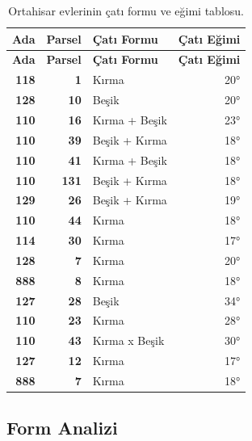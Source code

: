 \documentclass[12pt,turkish,a4paperpaper,]{report}
\begin{document}
\begin{longtable}[]{@{}rrlr@{}}
\caption{Ortahisar evlerinin çatı formu ve eğimi
tablosu.}\tabularnewline
\toprule
\textbf{Ada} & \textbf{Parsel} & \textbf{Çatı Formu} & \textbf{Çatı
Eğimi}\tabularnewline
\midrule
\endfirsthead
\toprule
\textbf{Ada} & \textbf{Parsel} & \textbf{Çatı Formu} & \textbf{Çatı
Eğimi}\tabularnewline
\midrule
\endhead
\textbf{118} & \textbf{1} & Kırma & 20°\tabularnewline
\textbf{128} & \textbf{10} & Beşik & 20°\tabularnewline
\textbf{110} & \textbf{16} & Kırma + Beşik & 23°\tabularnewline
\textbf{110} & \textbf{39} & Beşik + Kırma & 18°\tabularnewline
\textbf{110} & \textbf{41} & Kırma + Beşik & 18°\tabularnewline
\textbf{110} & \textbf{131} & Beşik + Kırma & 18°\tabularnewline
\textbf{129} & \textbf{26} & Beşik + Kırma & 19°\tabularnewline
\textbf{110} & \textbf{44} & Kırma & 18°\tabularnewline
\textbf{114} & \textbf{30} & Kırma & 17°\tabularnewline
\textbf{128} & \textbf{7} & Kırma & 20°\tabularnewline
\textbf{888} & \textbf{8} & Kırma & 18°\tabularnewline
\textbf{127} & \textbf{28} & Beşik & 34°\tabularnewline
\textbf{110} & \textbf{23} & Kırma & 28°\tabularnewline
\textbf{110} & \textbf{43} & Kırma x Beşik & 30°\tabularnewline
\textbf{127} & \textbf{12} & Kırma & 17°\tabularnewline
\textbf{888} & \textbf{7} & Kırma & 18°\tabularnewline
\bottomrule
\end{longtable}

\newpage

\hypertarget{form-analizi}{%
\subsection{Form Analizi}\label{form-analizi}}
\end{document}
